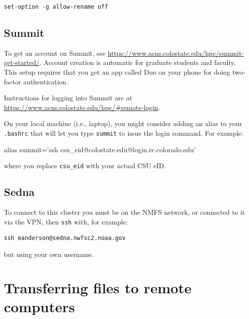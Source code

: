 \documentclass[]{krantz}
\makeatletter
\newenvironment{Shaded}{\begin{snugshade}}{\end{snugshade}}
\newcommand{\BuiltInTok}[1]{#1}
\newcommand{\NormalTok}[1]{#1}
\newcommand{\StringTok}[1]{\textcolor[rgb]{0.5,0.5,0.5}{#1}}
\newenvironment{kframe}{%
\medskip{}
\setlength{\fboxsep}{.8em}
 \def\at@end@of@kframe{}%
 \ifinner\ifhmode%
  \def\at@end@of@kframe{\end{minipage}}%
  \begin{minipage}{\columnwidth}%
 \fi\fi%
 \def\FrameCommand##1{\hskip\@totalleftmargin \hskip-\fboxsep
 \colorbox{shadecolor}{##1}\hskip-\fboxsep
     \hskip-\linewidth \hskip-\@totalleftmargin \hskip\columnwidth}%
 \MakeFramed {\advance\hsize-\width
   \@totalleftmargin\z@ \linewidth\hsize
   \@setminipage}}%
 {\par\unskip\endMakeFramed%
 \at@end@of@kframe}
\renewenvironment{Shaded}{\begin{kframe}}{\end{kframe}}
\makeatother
\begin{document}
\begin{verbatim}
set-option -g allow-rename off
\end{verbatim}

\hypertarget{summit}{%
\subsection{Summit}\label{summit}}

To get an account on Summit, see \url{https://www.acns.colostate.edu/hpc/summit-get-started/}. Account creation is automatic for graduate students and faculty. This setup requires
that you get an app called Duo on your phone for doing two-factor authentication.

Instructions for logging into Summit are at \url{https://www.acns.colostate.edu/hpc/\#remote-login}.

On your local machine (i.e., laptop), you might consider adding an alias to your
\texttt{.bashrc} that will let you type \texttt{summit} to issue the login command. For example:

\begin{Shaded}
\begin{Highlighting}[]
\BuiltInTok{alias}\NormalTok{ summit=}\StringTok{'ssh csu_eid@colostate.edu@login.rc.colorado.edu'}
\end{Highlighting}
\end{Shaded}

where you replace \texttt{csu\_eid} with your actual CSU eID.

\hypertarget{sedna}{%
\subsection{Sedna}\label{sedna}}

To connect to this cluster you must be on the NMFS network, or
connected to it via the VPN, then \texttt{ssh} with, for example:

\begin{verbatim}
ssh eanderson@sedna.nwfsc2.noaa.gov
\end{verbatim}

but using your own username.

\hypertarget{transferring-files-to-remote-computers}{%
\section{Transferring files to remote computers}\label{transferring-files-to-remote-computers}}
\end{document}
